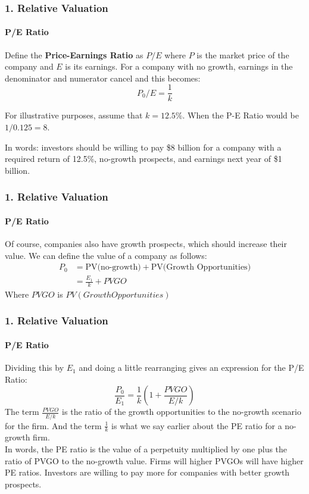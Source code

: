 \documentclass{beamer}
\begin{document}
\begin{frame}[t]
    \frametitle{1. Relative Valuation}
    \framesubtitle{P/E Ratio}

    Define the \textbf{Price-Earnings Ratio} as $P/E$ where $P$ is the market price of the company and $E$ is its earnings.  For a company with no growth, earnings in the denominator and numerator cancel and this becomes:
    $$P_0/E = \frac{1}{k}$$
    \vspace{1em}
    
    For illustrative purposes, assume that $k=12.5\%$. When the P-E Ratio would be $1/0.125 = 8$.
    \vspace{1em}

    In words: investors should be willing to pay \$8 billion for a company with a 
    required return of 12.5\%, no-growth prospects, and earnings next year of \$1 billion.

\end{frame}

\begin{frame}[t]
    \frametitle{1. Relative Valuation}
    \framesubtitle{P/E Ratio}

    Of course, companies also have growth prospects, which should increase their value.  
    We can define the value of a company as follows:
    \begin{align*}
    P_0 &= \text{PV(no-growth)} + \text{PV(Growth Opportunities)}\\
        &= \frac{E_1}{k} + PVGO
    \end{align*}
    Where $PVGO$ is $PV(Growth Opportunities)$\\

\end{frame}

\begin{frame}[t]
    \frametitle{1. Relative Valuation}
    \framesubtitle{P/E Ratio}

    Dividing this by $E_1$ and doing a little rearranging 
    gives an expression for the P/E Ratio:
    $$
    \frac{P_0}{E_1} = \frac{1}{k} \left(1 + \frac{PVGO}{E/k}\right)
    $$
    The term $\frac{PVGO}{E/k}$ is the ratio of the growth opportunities 
    to the no-growth scenario for the firm.  And the term $\frac{1}{k}$ is 
    what we say earlier about the PE ratio for a no-growth firm.\\
    \vspace{1em}
    In words, the PE ratio is the value of a perpetuity multiplied by 
    one plus the ratio of PVGO to the no-growth value.  Firms will higher 
    PVGOs will have higher PE ratios.   Investors are willing to pay more 
    for companies with better growth prospects.

\end{frame}
\end{document}
